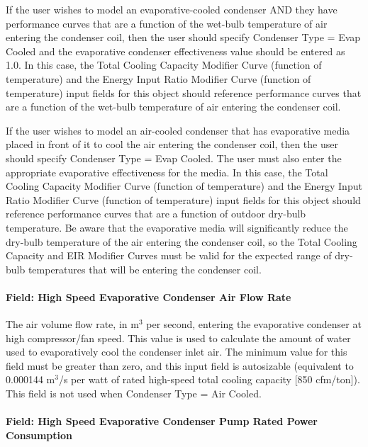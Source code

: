 If the user wishes to model an evaporative-cooled condenser AND they have performance curves that are a function of the wet-bulb temperature of air entering the condenser coil, then the user should specify Condenser Type = Evap Cooled and the evaporative condenser effectiveness value should be entered as 1.0. In this case, the Total Cooling Capacity Modifier Curve (function of temperature) and the Energy Input Ratio Modifier Curve (function of temperature) input fields for this object should reference performance curves that are a function of the wet-bulb temperature of air entering the condenser coil.

If the user wishes to model an air-cooled condenser that has evaporative media placed in front of it to cool the air entering the condenser coil, then the user should specify Condenser Type = Evap Cooled. The user must also enter the appropriate evaporative effectiveness for the media. In this case, the Total Cooling Capacity Modifier Curve (function of temperature) and the Energy Input Ratio Modifier Curve (function of temperature) input fields for this object should reference performance curves that are a function of outdoor dry-bulb temperature. Be aware that the evaporative media will significantly reduce the dry-bulb temperature of the air entering the condenser coil, so the Total Cooling Capacity and EIR Modifier Curves must be valid for the expected range of dry-bulb temperatures that will be entering the condenser coil.

\paragraph{Field: High Speed Evaporative Condenser Air Flow Rate}\label{field-high-speed-evaporative-condenser-air-flow-rate}

The air volume flow rate, in m\(^{3}\) per second, entering the evaporative condenser at high compressor/fan speed. This value is used to calculate the amount of water used to evaporatively cool the condenser inlet air. The minimum value for this field must be greater than zero, and this input field is autosizable (equivalent to 0.000144 m\(^{3}\)/s per watt of rated high-speed total cooling capacity {[}850 cfm/ton{]}). This field is not used when Condenser Type = Air Cooled.

\paragraph{Field: High Speed Evaporative Condenser Pump Rated Power Consumption}\label{field-high-speed-evaporative-condenser-pump-rated-power-consumption}

